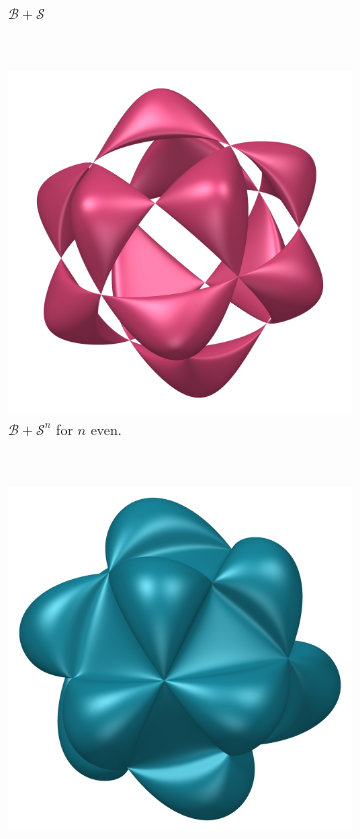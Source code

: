 \documentclass{article}
\begin{document}
\begin{figure}[h]
\begin{subfigure}[t]{0.2\textwidth}
            \caption{$\mathcal{B}+ \mathcal{S}$}
            \label{fig:construction_two}
        \end{subfigure}
        ~
        \begin{subfigure}[t]{0.2\textwidth}
            \includegraphics[width=\textwidth]{pictures/construction_two.png}
            \caption{$\mathcal{B} + \mathcal{S}^n$ for $n$ even.}
            \label{fig:construction_three}
        \end{subfigure}
        ~
        \begin{subfigure}[t]{0.2\textwidth}
            \includegraphics[width=\textwidth]{pictures/construction_odd.png}

\end{subfigure}
\end{figure}
\end{document}
